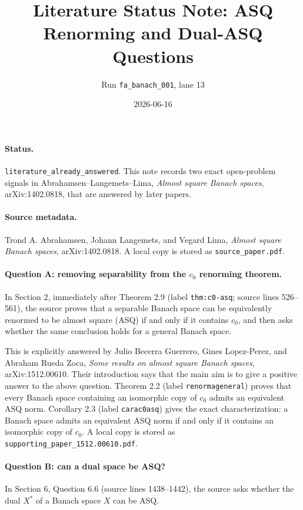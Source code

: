 \documentclass[11pt]{article}
\title{Literature Status Note: ASQ Renorming and Dual-ASQ Questions}
\author{Run \texttt{fa\_banach\_001}, lane 13}
\date{2026-06-16}
\begin{document}
\maketitle

\paragraph{Status.}
\texttt{literature\_already\_answered}. This note records two exact
open-problem signals in Abrahamsen--Langemets--Lima, \emph{Almost square
Banach spaces}, arXiv:1402.0818, that are answered by later papers.

\paragraph{Source metadata.}
Trond A. Abrahamsen, Johann Langemets, and Vegard Lima,
\emph{Almost square Banach spaces}, arXiv:1402.0818. A local copy is stored as
\texttt{source\_paper.pdf}.

\paragraph{Question A: removing separability from the $c_0$ renorming theorem.}
In Section 2, immediately after Theorem 2.9 (label \texttt{thm:c0-asq};
source lines 526--561), the source proves that a separable Banach space can be
equivalently renormed to be almost square (ASQ) if and only if it contains
$c_0$, and then asks whether the same conclusion holds for a general Banach
space.

This is explicitly answered by Julio Becerra Guerrero, Gines Lopez-Perez, and
Abraham Rueda Zoca, \emph{Some results on almost square Banach spaces},
arXiv:1512.00610. Their introduction says that the main aim is to give a
positive answer to the above question. Theorem 2.2 (label
\texttt{renormageneral}) proves that every Banach space containing an
isomorphic copy of $c_0$ admits an equivalent ASQ norm. Corollary 2.3 (label
\texttt{carac0asq}) gives the exact characterization: a Banach space admits an
equivalent ASQ norm if and only if it contains an isomorphic copy of $c_0$.
A local copy is stored as \texttt{supporting\_paper\_1512.00610.pdf}.

\paragraph{Question B: can a dual space be ASQ?}
In Section 6, Question 6.6 (source lines 1438--1442), the source asks whether
the dual $X^*$ of a Banach space $X$ can be ASQ.
\end{document}

